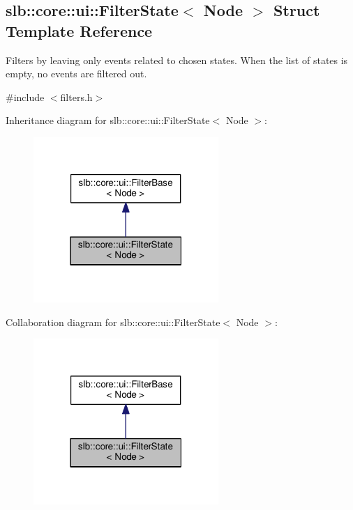 \hypertarget{structslb_1_1core_1_1ui_1_1FilterState}{}\subsection{slb\+:\+:core\+:\+:ui\+:\+:Filter\+State$<$ Node $>$ Struct Template Reference}
\label{structslb_1_1core_1_1ui_1_1FilterState}


Filters by leaving only events related to chosen states. When the list of states is empty, no events are filtered out.  




{\ttfamily \#include $<$filters.\+h$>$}



Inheritance diagram for slb\+:\+:core\+:\+:ui\+:\+:Filter\+State$<$ Node $>$\+:\nopagebreak
\begin{figure}[H]
\begin{center}
\leavevmode
\includegraphics[width=199pt]{structslb_1_1core_1_1ui_1_1FilterState__inherit__graph}
\end{center}
\end{figure}


Collaboration diagram for slb\+:\+:core\+:\+:ui\+:\+:Filter\+State$<$ Node $>$\+:\nopagebreak
\begin{figure}[H]
\begin{center}
\leavevmode
\includegraphics[width=199pt]{structslb_1_1core_1_1ui_1_1FilterState__coll__graph}
\end{center}
\end{figure}
